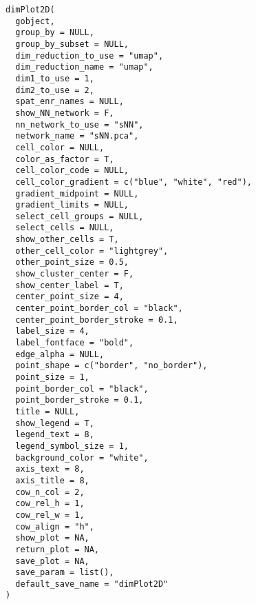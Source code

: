 \documentclass[a4paper]{book}
\begin{document}
%
\begin{Usage}
\begin{verbatim}
dimPlot2D(
  gobject,
  group_by = NULL,
  group_by_subset = NULL,
  dim_reduction_to_use = "umap",
  dim_reduction_name = "umap",
  dim1_to_use = 1,
  dim2_to_use = 2,
  spat_enr_names = NULL,
  show_NN_network = F,
  nn_network_to_use = "sNN",
  network_name = "sNN.pca",
  cell_color = NULL,
  color_as_factor = T,
  cell_color_code = NULL,
  cell_color_gradient = c("blue", "white", "red"),
  gradient_midpoint = NULL,
  gradient_limits = NULL,
  select_cell_groups = NULL,
  select_cells = NULL,
  show_other_cells = T,
  other_cell_color = "lightgrey",
  other_point_size = 0.5,
  show_cluster_center = F,
  show_center_label = T,
  center_point_size = 4,
  center_point_border_col = "black",
  center_point_border_stroke = 0.1,
  label_size = 4,
  label_fontface = "bold",
  edge_alpha = NULL,
  point_shape = c("border", "no_border"),
  point_size = 1,
  point_border_col = "black",
  point_border_stroke = 0.1,
  title = NULL,
  show_legend = T,
  legend_text = 8,
  legend_symbol_size = 1,
  background_color = "white",
  axis_text = 8,
  axis_title = 8,
  cow_n_col = 2,
  cow_rel_h = 1,
  cow_rel_w = 1,
  cow_align = "h",
  show_plot = NA,
  return_plot = NA,
  save_plot = NA,
  save_param = list(),
  default_save_name = "dimPlot2D"
)
\end{verbatim}
\end{Usage}
%
\end{document}
